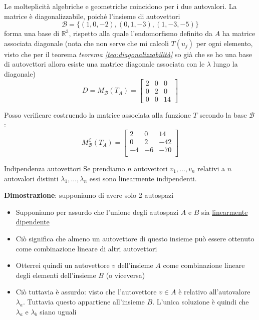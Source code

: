 Le molteplicità algebriche e geometriche coincidono per i due autovalori. La matrice è diagonalizzabile, poiché l'insieme di autovettori
\[
	\mathcal{B}=\{(1,0,-2),(0,1,-3),(1,-3,-5)\}
\]
forma una base di $\mathbb{R}^3$, rispetto alla quale l'endomorfismo definito da $A$ ha matrice associata diagonale (nota che non serve che mi calcoli $ T\left( u_j \right)  $ per ogni elemento, visto che per il teorema \textit{teorema  \ref{teo:diagonalizzabilità}} so già che se ho una base di autovettori allora esiste una matrice diagonale associata con le $ \lambda  $ lungo la diagonale)
\[
	D=M_{\mathcal{B}}\left(T_A\right)=\left[\begin{array}{ccc}
			2 & 0 & 0  \\
			0 & 2 & 0  \\
			0 & 0 & 14
		\end{array}\right]
\]

Posso verificare costruendo la matrice associata alla funzione $ T $ secondo la base $ \mathcal{B} $:
\[
	M_{ \mathcal{B}}^{ \mathcal{E} }\left( T_A \right)=
	\begin{bmatrix}
		2  & 0  & 14  \\
		0  & 2  & -42 \\
		-4 & -6 & -70 \\
	\end{bmatrix}
\]
\begin{teorema}{Indipendenza autovettori}
	Se prendiamo $ n $ autovettori $ v_1,\ldots,v_{n} $ relativi a $ n $ autovalori distinti $ \lambda_1,\ldots, \lambda_n $ essi sono linearmente indipendenti.
\end{teorema}
\label{teo:indipendenzaAutovettori}
\textbf{Dimostrazione}: supponiamo di avere solo 2 autospazi
\begin{itemize}
	\item Supponiamo per assurdo che l'unione degli autospazi $ A $ e $ B $ sia \underline{linearmente dipendente}
	\item Ciò significa che almeno un autovettore di questo insieme può essere ottenuto come combinazione lineare di altri autovettori
	\item Otterrei quindi un autovettore $ v $ dell'insieme $ A $ come combinazione lineare degli elementi dell'insieme $ B $ (o viceversa)
	\item Ciò tuttavia è assurdo: visto che l'autovettore $ v \in A	$ è relativo all'autovalore $ \lambda_a $. Tuttavia questo appartiene all'insieme $ B $. L'unica soluzione è quindi che $ \lambda_a $ e $ \lambda_b $ siano uguali
\end{itemize}

